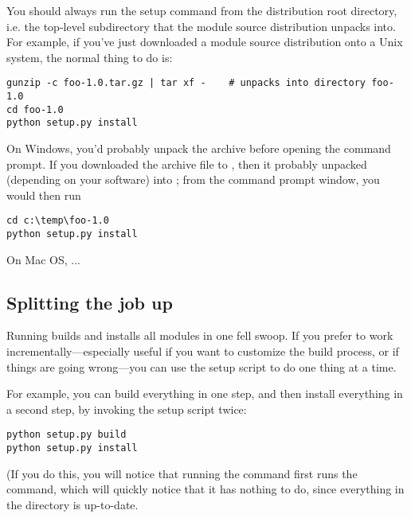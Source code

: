 \documentclass{howto}
\begin{document}
You should always run the setup command from the distribution root
directory, i.e. the top-level subdirectory that the module source
distribution unpacks into.  For example, if you've just downloaded a
module source distribution  onto a Unix system, the 
normal thing to do is:
\begin{verbatim}
gunzip -c foo-1.0.tar.gz | tar xf -    # unpacks into directory foo-1.0
cd foo-1.0
python setup.py install
\end{verbatim}

On Windows, you'd probably unpack the archive before opening the command 
prompt.  If you downloaded the archive file to , then
it probably unpacked (depending on your software) into
; from the command prompt window, you would
then run
\begin{verbatim}
cd c:\temp\foo-1.0
python setup.py install
\end{verbatim}

On Mac OS, ... 


\subsection{Splitting the job up}

Running  builds and installs all modules in one
fell swoop.  If you prefer to work incrementally---especially useful if
you want to customize the build process, or if things are going
wrong---you can use the setup script to do one thing at a time.

For example, you can build everything in one step, and then install
everything in a second step, by invoking the setup script twice:
\begin{verbatim}
python setup.py build
python setup.py install
\end{verbatim}
(If you do this, you will notice that running the 
command first runs the  command, which will quickly
notice that it has nothing to do, since everything in the 
directory is up-to-date.

\comingsoon
\end{document}
